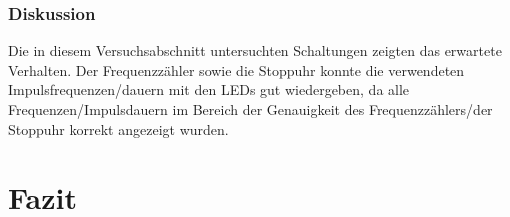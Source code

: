 \documentclass[12pt,a4paper]{article}
\begin{document}
\subsubsection*{Diskussion}
Die in diesem Versuchsabschnitt untersuchten Schaltungen zeigten das erwartete Verhalten. Der Frequenzzähler sowie die Stoppuhr konnte die verwendeten Impulsfrequenzen/dauern mit den LEDs gut wiedergeben, da alle Frequenzen/Impulsdauern im Bereich der Genauigkeit des Frequenzzählers/der Stoppuhr korrekt angezeigt wurden.

\section{Fazit}
\end{document}
